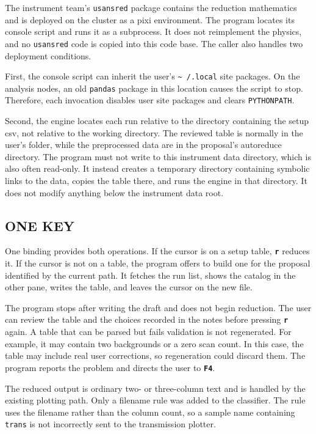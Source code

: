 \documentclass[tm]{ornltm}
\newcommand{\key}[1]{\textbf{\texttt{#1}}}
\begin{document}
The instrument team's \texttt{usansred} package contains the reduction
mathematics and is deployed on the cluster as a pixi environment. The program
locates its console script and runs it as a subprocess. It does not reimplement
the physics, and no \texttt{usansred} code is copied into this code base. The
caller also handles two deployment conditions.

First, the console script can inherit the user's \texttt{\textasciitilde
/.local} site packages. On the analysis nodes, an old \texttt{pandas} package in
this location causes the script to stop. Therefore, each invocation disables
user site packages and clears \texttt{PYTHONPATH}.

Second, the engine locates each run relative to the directory containing the
setup \ac{csv}, not relative to the working directory. The reviewed table is
normally in the user's folder, while the preprocessed data are in the proposal's
autoreduce directory. The program must not write to this instrument data
directory, which is also often read-only. It instead creates a temporary
directory containing symbolic links to the data, copies the table there, and
runs the engine in that directory. It does not modify anything below the
instrument data root.

\subsection{ONE KEY}

One binding provides both operations. If the cursor is on a setup table,
\key{r} reduces it. If the cursor is not on a table, the program offers to build
one for the proposal identified by the current path. It fetches the run list,
shows the catalog in the other pane, writes the table, and leaves the cursor on
the new file.

The program stops after writing the draft and does not begin reduction. The user
can review the table and the choices recorded in the notes before pressing
\key{r} again. A table that can be parsed but fails validation is not regenerated.
For example, it may contain two backgrounds or a zero scan count. In this case,
the table may include real user corrections, so regeneration could discard
them. The program reports the problem and directs the user to \key{F4}.

The reduced output is ordinary two- or three-column text and is handled by the
existing plotting path. Only a filename rule was added to the classifier. The
rule uses the filename rather than the column count, so a sample name containing
\texttt{trans} is not incorrectly sent to the transmission plotter.
\end{document}
